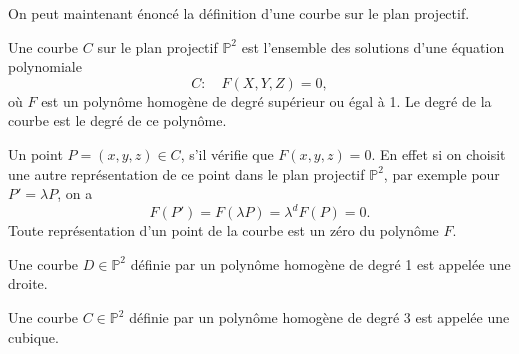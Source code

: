 On peut maintenant énoncé la définition d'une courbe sur le plan projectif.

\begin{definition}
    \label{def:courbe}
    Une courbe $C$ sur le plan projectif $\mathbb{P}^2$ est l'ensemble des solutions d'une
    équation polynomiale 
    \[
    C : \quad F(X,Y,Z)=0
    ,\] 
    où $F$ est un polynôme homogène de degré supérieur ou égal à 1. Le degré de la courbe
    est le degré de ce polynôme.
\end{definition}

Un point $P = (x,y,z) \in C$, s'il vérifie que $F(x,y,z)=0$. En effet si on choisit une autre
représentation de ce point dans le plan projectif $\mathbb{P}^2$, par exemple pour
$P'=\lambda P$, on a
\[
F(P')=F(\lambda P) = \lambda^{d}F(P) = 0
.\] 
Toute représentation d'un point de la courbe est un zéro du polynôme $F$.

\begin{definition}
    Une courbe $D \in \mathbb{P}^2$ définie par un polynôme homogène de degré 1 est appelée
    une droite.

    Une courbe $C \in \mathbb{P}^2$ définie par un polynôme homogène de degré $3$ est appelée
    une cubique.
\end{definition}






